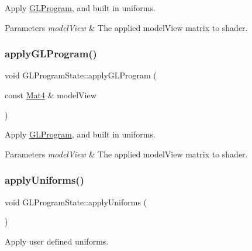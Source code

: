 Apply \hyperlink{classGLProgram}{G\+L\+Program}, and built in uniforms. 
\begin{DoxyParams}{Parameters}
{\em model\+View} & The applied model\+View matrix to shader. \\
\hline
\end{DoxyParams}
\mbox{\label{classGLProgramState_a2caeee298087f126c4460752a6f42bc5}} 
\subsubsection{\texorpdfstring{apply\+G\+L\+Program()}{applyGLProgram()}\hspace{0.1cm}{\footnotesize\ttfamily [2/2]}}
{\footnotesize\ttfamily void G\+L\+Program\+State\+::apply\+G\+L\+Program (\begin{DoxyParamCaption}\item[{const \hyperlink{classMat4}{Mat4} \&}]{model\+View }\end{DoxyParamCaption})}

Apply \hyperlink{classGLProgram}{G\+L\+Program}, and built in uniforms. 
\begin{DoxyParams}{Parameters}
{\em model\+View} & The applied model\+View matrix to shader. \\
\hline
\end{DoxyParams}
\mbox{\label{classGLProgramState_ac673949ce3b48aa2a31ad2457bfa5a2c}} 
\subsubsection{\texorpdfstring{apply\+Uniforms()}{applyUniforms()}\hspace{0.1cm}{\footnotesize\ttfamily [1/2]}}
{\footnotesize\ttfamily void G\+L\+Program\+State\+::apply\+Uniforms (\begin{DoxyParamCaption}{ }\end{DoxyParamCaption})}

Apply user defined uniforms. \mbox{\label{classGLProgramState_ac673949ce3b48aa2a31ad2457bfa5a2c}} 
